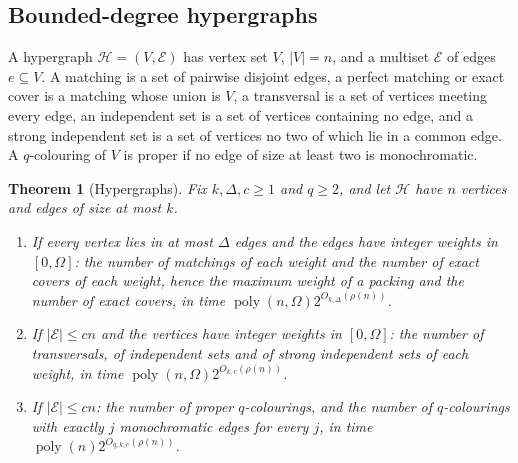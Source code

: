 \documentclass[11pt,reqno]{amsart}
\numberwithin{equation}{section}
\theoremstyle{plain}
\newtheorem{theorem}{Theorem}[section]
\theoremstyle{definition}
\theoremstyle{remark}
\DeclareMathOperator{\poly}{poly}
\newcommand{\rhon}{\rho}
\begin{document}
\subsection{Bounded-degree hypergraphs}\label{ssec:hypergraphs}
A hypergraph $\mathcal H=(V,\mathcal E)$ has vertex set $V$, $|V|=n$, and a
multiset $\mathcal E$ of edges $e\subseteq V$. A matching is a set of pairwise
disjoint edges, a perfect matching or exact cover is a matching whose union is
$V$, a transversal is a set of vertices meeting every edge, an independent set is
a set of vertices containing no edge, and a strong independent set is a set of
vertices no two of which lie in a common edge. A $q$-colouring of $V$ is proper
if no edge of size at least two is monochromatic.

\begin{theorem}[Hypergraphs]\label{thm:hypergraphs}
Fix $k,\Delta,c\ge1$ and $q\ge2$, and let $\mathcal H$ have $n$ vertices and
edges of size at most $k$.
\begin{enumerate}[label=\textup{(\roman*)},leftmargin=2.2em]
\item\label{it:hmatch} If every vertex lies in at most $\Delta$ edges and the
edges have integer weights in $[0,\Omega]$: the number of matchings of each
weight and the number of exact covers of each weight, hence the maximum weight
of a packing and the number of exact covers, in time
$\poly(n,\Omega)2^{O_{k,\Delta}(\rhon(n))}$.
\item\label{it:hindep} If $|\mathcal E|\le cn$ and the vertices have integer
weights in $[0,\Omega]$: the number of transversals, of independent sets and of
strong independent sets of each weight, in time
$\poly(n,\Omega)2^{O_{k,c}(\rhon(n))}$.
\item\label{it:hcol} If $|\mathcal E|\le cn$: the number of proper
$q$-colourings, and the number of $q$-colourings with exactly $j$ monochromatic
edges for every $j$, in time $\poly(n)2^{O_{q,k,c}(\rhon(n))}$.
\end{enumerate}
\end{theorem}
\end{document}
